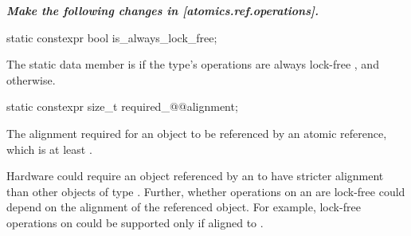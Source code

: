 \textbf{\textit{Make the following changes in [atomics.ref.operations].}} \\


\begin{itemdecl}
static constexpr bool is_always_lock_free;
\end{itemdecl}

\begin{itemdescr}
\pnum
The static data member  is 
if the  type's operations are always lock-free
,
and  otherwise.
\end{itemdescr}


\begin{itemdecl}
static constexpr size_t required_@@alignment;
\end{itemdecl}

\begin{itemdescr}
\pnum
The alignment required for an object to be referenced  by an atomic reference,
which is at least .

\pnum
\begin{note}
Hardware could require an object
referenced by an 
to have stricter alignment
than other objects of type .
Further, whether operations on an 
are lock-free could depend on the alignment of the referenced object.
For example, lock-free operations on 
could be supported only if aligned to .
\end{note}
\end{itemdescr}


